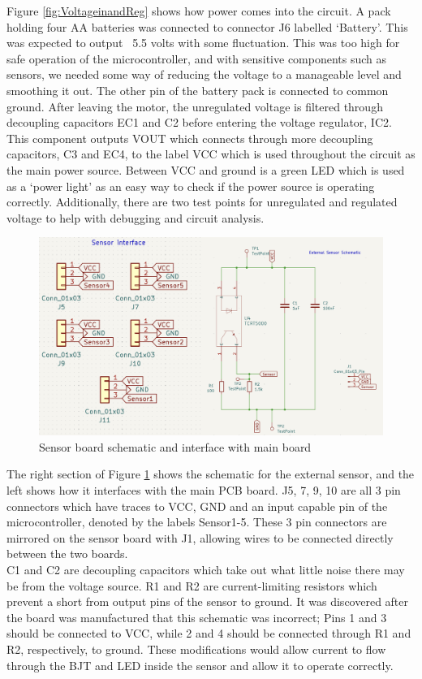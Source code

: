 Figure \ref{fig:VoltageinandReg} shows how power comes into the circuit. A pack holding four AA batteries was connected to connector J6 labelled ‘Battery’. This was expected to output ~5.5 volts with some fluctuation. This was too high for safe operation of the microcontroller, and with sensitive components such as sensors, we needed some way of reducing the voltage to a manageable level and smoothing it out. The other pin of the battery pack is connected to common ground. After leaving the motor, the unregulated voltage is filtered through decoupling capacitors EC1 and C2 before entering the voltage regulator, IC2. This component outputs VOUT which connects through more decoupling capacitors, C3 and EC4, to the label VCC which is used throughout the circuit as the main power source. Between VCC and ground is a green LED which is used as a ‘power light’ as an easy way to check if the power source is operating correctly. Additionally, there are two test points for unregulated and regulated voltage to help with debugging and circuit analysis. 
\\


\begin{figure}[H]
    \centering
    \includegraphics[width=0.7\linewidth]{REPORT/Sensor.png}
    \caption{Sensor board schematic and interface with main board}
    \label{fig:SensorSchem}
\end{figure}

The right section of Figure \ref{fig:SensorSchem} shows the schematic for the external sensor, and the left shows how it interfaces with the main PCB board. J5, 7, 9, 10 are all 3 pin connectors which have traces to VCC, GND and an input capable pin of the microcontroller, denoted by the labels Sensor1-5. These 3 pin connectors are mirrored on the sensor board with J1, allowing wires to be connected directly between the two boards. 
\\

C1 and C2 are decoupling capacitors which take out what little noise there may be from the voltage source. R1 and R2 are current-limiting resistors which prevent a short from output pins of the sensor to ground. It was discovered after the board was manufactured that this schematic was incorrect; Pins 1 and 3 should be connected to VCC, while 2 and 4 should be connected through R1 and R2, respectively, to ground. These modifications would allow current to flow through the BJT and LED inside the sensor and allow it to operate correctly. 
\\

